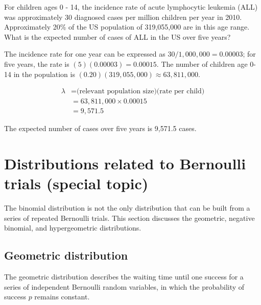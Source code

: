 \begin{example}{
For children ages 0 - 14, the incidence rate of acute lymphocytic leukemia (ALL) was approximately 30 diagnosed cases per million children per year in 2010. Approximately 20\% of the US population of 319,055,000 are in this age range. What is the expected number of cases of ALL in the US over five years?}

The incidence rate for one year can be expressed as $30/1,000,000 = 0.00003$; for five years, the rate is $(5)(0.00003) = 0.00015$. The number of children age 0-14 in the population is $(0.20)(319,055,000) \approx 63,811,000$. 

\begin{align*}
\lambda &= \text{(relevant population size)(rate per child)} \\
&= 63,811,000 \times 0.00015 \\
&= 9,571.5
\end{align*}
	
The expected number of cases over five years is 9,571.5 cases.	
	
\end{example}



\newpage

\section{Distributions related to Bernoulli trials (special topic)}

The binomial distribution is not the only distribution that can be built from a series of repeated Bernoulli trials. This section discusses the geometric, negative binomial, and hypergeometric distributions.

\subsection{Geometric distribution}
\label{geomDist}


The geometric distribution describes the waiting time until one success for a series of independent Bernoulli random variables, in which the probability of success $p$ remains constant.

